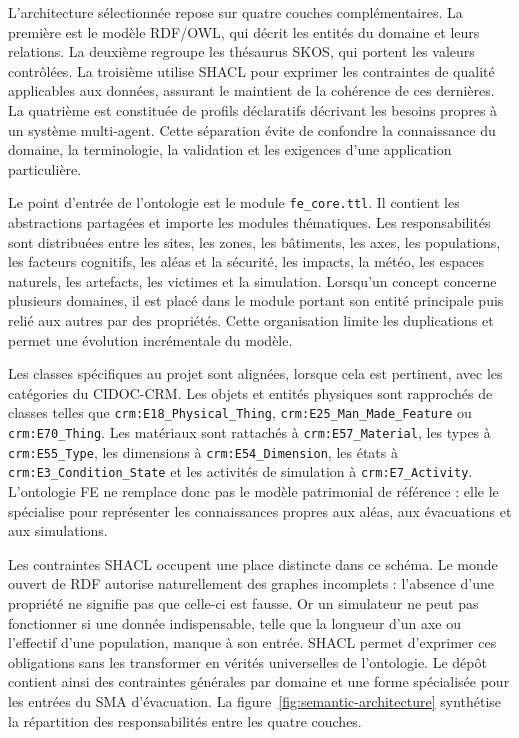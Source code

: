 \documentclass{article}
\begin{document}
L'architecture sélectionnée repose sur quatre couches complémentaires. La première est le modèle RDF/OWL, qui décrit les entités du domaine et leurs relations. La deuxième regroupe les thésaurus SKOS, qui portent les valeurs contrôlées. La troisième utilise SHACL pour exprimer les contraintes de qualité applicables aux données, assurant le maintient de la cohérence de ces dernières. La quatrième est constituée de profils déclaratifs décrivant les besoins propres à un système multi-agent. Cette séparation évite de confondre la connaissance du domaine, la terminologie, la validation et les exigences d'une application particulière.

Le point d'entrée de l'ontologie est le module \texttt{fe\_core.ttl}. Il contient les abstractions partagées et importe les modules thématiques. Les responsabilités sont distribuées entre les sites, les zones, les bâtiments, les axes, les populations, les facteurs cognitifs, les aléas et la sécurité, les impacts, la météo, les espaces naturels, les artefacts, les victimes et la simulation. Lorsqu'un concept concerne plusieurs domaines, il est placé dans le module portant son entité principale puis relié aux autres par des propriétés. Cette organisation limite les duplications et permet une évolution incrémentale du modèle.

Les classes spécifiques au projet sont alignées, lorsque cela est pertinent, avec les catégories du CIDOC-CRM. Les objets et entités physiques sont rapprochés de classes telles que \texttt{crm:E18\_Physical\_Thing}, \texttt{crm:E25\_Man\_Made\_Feature} ou \texttt{crm:E70\_Thing}. Les matériaux sont rattachés à \texttt{crm:E57\_Material}, les types à \texttt{crm:E55\_Type}, les dimensions à \texttt{crm:E54\_Dimension}, les états à \texttt{crm:E3\_Condition\_State} et les activités de simulation à \texttt{crm:E7\_Activity}. L'ontologie FE ne remplace donc pas le modèle patrimonial de référence : elle le spécialise pour représenter les connaissances propres aux aléas, aux évacuations et aux simulations.

Les contraintes SHACL occupent une place distincte dans ce schéma. Le monde ouvert de RDF autorise naturellement des graphes incomplets : l'absence d'une propriété ne signifie pas que celle-ci est fausse. Or un simulateur ne peut pas fonctionner si une donnée indispensable, telle que la longueur d'un axe ou l'effectif d'une population, manque à son entrée. SHACL permet d'exprimer ces obligations sans les transformer en vérités universelles de l'ontologie. Le dépôt contient ainsi des contraintes générales par domaine et une forme spécialisée pour les entrées du SMA d'évacuation. La figure~\ref{fig:semantic-architecture} synthétise la répartition des responsabilités entre les quatre couches.
\end{document}
